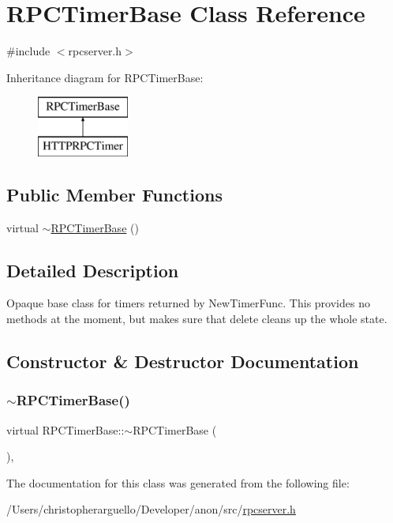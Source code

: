 \hypertarget{class_r_p_c_timer_base}{}\section{R\+P\+C\+Timer\+Base Class Reference}
\label{class_r_p_c_timer_base}


{\ttfamily \#include $<$rpcserver.\+h$>$}

Inheritance diagram for R\+P\+C\+Timer\+Base\+:\begin{figure}[H]
\begin{center}
\leavevmode
\includegraphics[height=2.000000cm]{class_r_p_c_timer_base}
\end{center}
\end{figure}
\subsection*{Public Member Functions}
\begin{DoxyCompactItemize}
\item 
virtual \mbox{\hyperlink{class_r_p_c_timer_base_ad478959ba7dd7047ba0c311323606ada}{$\sim$\+R\+P\+C\+Timer\+Base}} ()
\end{DoxyCompactItemize}


\subsection{Detailed Description}
Opaque base class for timers returned by New\+Timer\+Func. This provides no methods at the moment, but makes sure that delete cleans up the whole state. 

\subsection{Constructor \& Destructor Documentation}
\mbox{\label{class_r_p_c_timer_base_ad478959ba7dd7047ba0c311323606ada}} 
\subsubsection{\texorpdfstring{$\sim$\+R\+P\+C\+Timer\+Base()}{~RPCTimerBase()}}
{\footnotesize\ttfamily virtual R\+P\+C\+Timer\+Base\+::$\sim$\+R\+P\+C\+Timer\+Base (\begin{DoxyParamCaption}{ }\end{DoxyParamCaption})\hspace{0.3cm}{\ttfamily [inline]}, {\ttfamily [virtual]}}



The documentation for this class was generated from the following file\+:\begin{DoxyCompactItemize}
\item 
/\+Users/christopherarguello/\+Developer/anon/src/\mbox{\hyperlink{rpcserver_8h}{rpcserver.\+h}}\end{DoxyCompactItemize}
